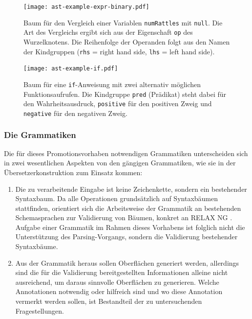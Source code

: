 \documentclass[paper=a4,fontsize=11pt,parskip=half]{scrartcl}
\begin{document}
\begin{figure}[p]
  \centering\texttt{[image: ast-example-expr-binary.pdf]}
  \caption{Baum für den Vergleich einer Variablen \texttt{numRattles} mit \texttt{null}. Die Art des Vergleichs ergibt sich aus der Eigenschaft \texttt{op} des Wurzelknotens. Die Reihenfolge der Operanden folgt aus den Namen der Kindgruppen (\texttt{rhs} = right hand side, \texttt{lhs} = left hand side).}
  \label{fig:ast-example-binary}
\end{figure}

\begin{figure}[p]
  \centering\texttt{[image: ast-example-if.pdf]}
  \caption{Baum für eine \texttt{if}-Anweisung mit zwei alternativ möglichen Funktionsaufrufen. Die Kindgruppe \texttt{pred} (Prädikat) steht dabei für den Wahrheitsausdruck, \texttt{positive} für den positiven Zweig und \texttt{negative} für den negativen Zweig.}
  \label{fig:ast-example-if}
\end{figure}

\subsubsection{Die Grammatiken}
\label{sec:grammars}

Die für dieses Promotionsvorhaben notwendigen Grammatiken unterscheiden sich in zwei wesentlichen Aspekten von den gängigen Grammatiken, wie sie in der Übersetzerkonstruktion zum Einsatz kommen:

\begin{enumerate}
\item Die zu verarbeitende Eingabe ist keine Zeichenkette, sondern ein bestehender Syntaxbaum. Da alle Operationen grundsätzlich auf Syntaxbäumen stattfinden, orientiert sich die Arbeitsweise der Grammatik an bestehenden Schemasprachen zur Validierung von Bäumen, konkret an RELAX NG \cite{clark_relax_2001}. Aufgabe einer Grammatik im Rahmen dieses Vorhabens ist folglich nicht die Unterstützung des Parsing-Vorgangs, sondern die Validierung bestehender Syntaxbäume.
\item Aus der Grammatik heraus sollen Oberflächen generiert werden, allerdings sind die für die Validierung bereitgestellten Informationen alleine nicht ausreichend, um daraus sinnvolle Oberflächen zu generieren. Welche Annotationen notwendig oder hilfreich sind und wo diese Annotation vermerkt werden sollen, ist Bestandteil der zu untersuchenden Fragestellungen.
\end{enumerate}
\end{document}
